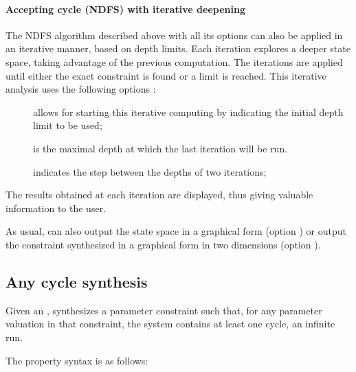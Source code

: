 \paragraph{Accepting cycle (NDFS) with iterative deepening}\label{sss:accepting-loop-NDFS-iterative}

The NDFS algorithm described above with all its options
can also be applied
in an iterative manner, based on depth limits. Each iteration explores a deeper state
space, taking advantage of the previous computation. The iterations are applied until
either the exact constraint is found or a limit is reached. This iterative analysis
uses the following options :

\begin{description}
	\item[] allows for starting this iterative computing by indicating
	      the initial depth limit to be used;
	\item[] is the maximal depth at which the last iteration
	      will be run.
	\item[] indicates the step between the depths of two iterations;
\end{description}

The results obtained at each iteration are displayed, thus giving valuable information
to the user.

\medskip


As usual, \imitator{} can also
output the state space in a graphical form (option )
or
output the constraint synthesized in a graphical form in two dimensions (option ).


\subsection{Any cycle synthesis}\label{ss:loop}


Given an \NIPTA{}, \imitator{} synthesizes a parameter constraint such that, for any parameter valuation in that constraint, the system contains at least one cycle, \ie{} an infinite run. %

The property syntax is as follows:




